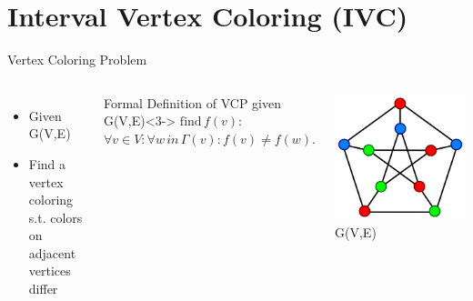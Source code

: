 \section{Interval Vertex Coloring (IVC)}

\begin{frame}{Vertex Coloring Problem}
  \begin{columns}
      \begin{itemize}
        \item<1-> Given G(V,E)
        \item<2-> Find a vertex coloring s.t. colors on adjacent vertices differ
      \end{itemize}
      \begin{block}{Formal Definition of VCP given G(V,E)}<3->
        $\text{find} \, f(v):$
        $\forall v\in V:\forall w \, in \, \Gamma(v): f(v) \neq f(w).$
      \end{block}
      
    \centering
      \null
    \includegraphics[width=\textwidth]{figures/graph_coloring.png}
    \null
    \centering
      G(V,E)
  \end{columns}
\end{frame}

